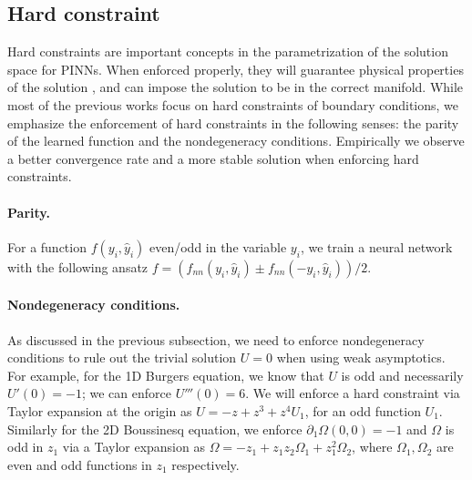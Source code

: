 \documentclass[12pt]{caltech_thesis}
\numberwithin{equation}{section}
\begin{document}
\subsection{Hard constraint}\label{subsec:hard}
Hard constraints are important concepts in the parametrization of the solution space for PINNs.
When enforced properly, they will guarantee physical properties of the solution \cite{lu2021physics, richter2022neural,mohan2023embedding,duruisseaux2024towards}, and
can impose the solution to be in the correct manifold. While most of the previous works focus on hard constraints of boundary conditions,
we emphasize the enforcement of hard constraints in the following senses: the parity of the learned function
and the nondegeneracy conditions. Empirically we observe a better convergence rate and a more stable solution
when enforcing hard constraints.

\paragraph{Parity.} For a function $f(y_i,\hat{y}_i)$ even/odd in the variable $y_i$, we train a neural network 
with the following ansatz $f=(f_{nn}(y_i,\hat{y}_i)\pm f_{nn}(-y_i,\hat{y}_i))/2$. 

\paragraph{Nondegeneracy conditions.} As discussed in the previous subsection, we need to enforce 
nondegeneracy conditions to rule out the trivial solution $U=0$ when using weak asymptotics.
For example, for the 1D Burgers equation, we know that $U$ is odd and necessarily $U'(0)=-1$; 
we can enforce $U'''(0)=6$. We will enforce a hard constraint
via Taylor expansion at the origin as $U=-z+z^3+z^4U_1$, for an odd function $U_1$. 
Similarly for the 2D Boussinesq equation, we enforce $\partial_{1}\Omega(0,0)=-1$ and $\Omega$
is odd in $z_1$ via a Taylor expansion as $\Omega=-z_1+z_1z_2\Omega_1+z_1^2\Omega_2$, 
where $\Omega_1,\Omega_2$ are even and odd functions in $z_1$ respectively.
\end{document}
